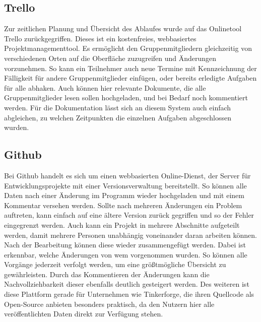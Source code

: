 
\subsection{Trello}
Zur zeitlichen Planung und Übersicht des Ablaufes wurde auf das Onlinetool Trello zurückgegriffen. Dieses ist ein kostenfreies, webbasiertes Projektmanagementtool. Es ermöglicht den Gruppenmitgliedern gleichzeitig von verschiedenen Orten auf die Oberfläche zuzugreifen und Änderungen vorzunehmen. So kann ein Teilnehmer auch neue Termine mit Kennzeichnung der Fälligkeit für andere Gruppenmitglieder einfügen, oder bereits erledigte Aufgaben für alle abhaken. Auch können hier relevante Dokumente, die alle Gruppenmitglieder lesen sollen hochgeladen, und bei Bedarf noch kommentiert werden. Für die Dokumentation lässt sich an diesem System auch einfach abgleichen, zu welchen Zeitpunkten die einzelnen Aufgaben abgeschlossen wurden.
\subsection{Github}
Bei Github handelt es sich um einen webbasierten Online-Dienst, der Server für Entwicklungsprojekte mit einer Versionsverwaltung bereitstellt. So können alle Daten nach einer Änderung im Programm wieder hochgeladen und mit einem Kommentar versehen werden. Sollte nach mehreren Änderungen ein Problem auftreten, kann einfach auf eine ältere Version zurück gegriffen und so der Fehler eingegrenzt werden. Auch kann ein Projekt in mehrere Abschnitte aufgeteilt werden, damit mehrere Personen unabhängig voneinander daran arbeiten können. Nach der Bearbeitung können diese wieder zusammengefügt werden. Dabei ist erkennbar, welche Änderungen von wem vorgenommen wurden. So können alle Vorgänge jederzeit verfolgt werden, um eine größtmögliche Übersicht zu gewährleisten. Durch das Kommentieren der Änderungen kann die Nachvollziehbarkeit dieser ebenfalls deutlich gesteigert werden. Des weiteren ist diese Plattform gerade für Unternehmen wie Tinkerforge, die ihren Quellcode als Open-Source anbieten besonders praktisch, da den Nutzern hier alle veröffentlichten Daten direkt zur Verfügung stehen.